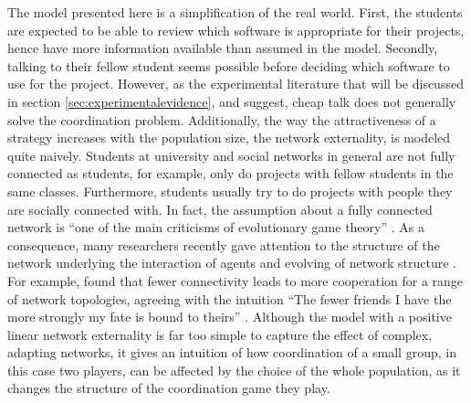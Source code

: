 The model presented here is a simplification of the real world. 
First, the students are expected to be able to review which software is 
appropriate for their projects, hence have more information available than 
assumed in the model. Secondly, talking to their fellow student seems
possible before deciding which software to use for the project. 
However, as the experimental literature that will be discussed in section 
\ref{sec:experimentalevidence}, and \textcite{aumann_nash_1990} suggest, 
cheap talk does not generally solve the coordination problem. 
Additionally, the way the attractiveness of a strategy increases with
the population size, the network externality, is modeled quite naively.
Students at university and social networks in general are not fully
connected as students, for example, only do projects with fellow students
in the same classes. Furthermore, students usually try to do projects
with people they are socially connected with. In fact, the assumption about
a fully connected network is ``one of the main criticisms of evolutionary game
theory'' \parencite{hanauske_evolutionare_2011}. 
As a consequence, many researchers recently gave attention to the 
structure of the network underlying the interaction of agents and 
evolving of network structure \parencite[46]{szabo_evolutionary_2007}.
For example, \textcite{ohtsuki_simple_2006} found 
that fewer connectivity 
leads to more cooperation for a range of network topologies,
agreeing with the intuition
``The fewer friends I have the more strongly my fate is bound to theirs'' 
\parencite[1]{ohtsuki_simple_2006}.
Although the model with a positive linear network externality is far too 
simple to capture the effect of complex, adapting networks, it gives an 
intuition of how coordination of a small group, in this case two players, 
can be affected by the choice of the whole population, as it changes
the structure of the coordination game they play.
